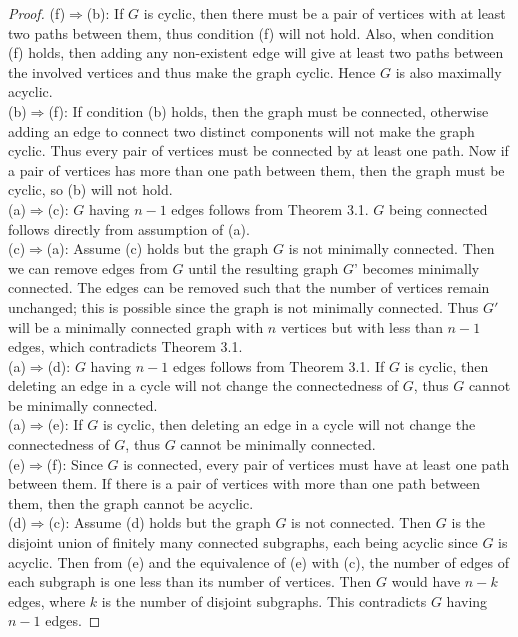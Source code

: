\documentclass{article}
\begin{document}
\begin{enumerate}[label={\bf Q\arabic*:}]
\begin{proof}
      (f)$\Rightarrow$(b): If $G$ is cyclic, then there must be a pair of
      vertices with at least two paths between them, thus condition (f)
      will not hold. Also, when condition (f) holds, then adding any
      non-existent edge will give at least two paths between the involved
      vertices and thus make the graph cyclic. Hence $G$ is also maximally
      acyclic. \\

      (b)$\Rightarrow$(f): If condition (b) holds, then the graph must be
      connected, otherwise adding an edge to connect two distinct
      components will not make the graph cyclic. Thus every pair of
      vertices must be connected by at least one path. Now if a pair of
      vertices has more than one path between them, then the graph must be
      cyclic, so (b) will not hold. \\

      (a)$\Rightarrow$(c): $G$ having $n-1$ edges follows from Theorem 3.1.
      $G$ being connected follows directly from assumption of (a). \\

      (c)$\Rightarrow$(a): Assume (c) holds but the graph $G$ is not
      minimally connected. Then we can remove edges from $G$ until the
      resulting graph $G$' becomes minimally connected. The edges can be
      removed such that the number of vertices remain unchanged; this is
      possible since the graph is not minimally connected. Thus $G'$ will
      be a minimally connected graph with $n$ vertices but with less than
      $n-1$ edges, which contradicts Theorem 3.1. \\

      (a)$\Rightarrow$(d): $G$ having $n-1$ edges follows from Theorem 3.1.
      If $G$ is cyclic, then deleting an edge in a cycle will not change
      the connectedness of $G$, thus $G$ cannot be minimally connected. \\

      (a)$\Rightarrow$(e): If $G$ is cyclic, then deleting an edge in a
      cycle will not change the connectedness of $G$, thus $G$ cannot be
      minimally connected. \\

      (e)$\Rightarrow$(f): Since $G$ is connected, every pair of vertices
      must have at least one path between them. If there is a pair of
      vertices with more than one path between them, then the graph cannot
      be acyclic. \\

      (d)$\Rightarrow$(c): Assume (d) holds but the graph $G$ is not
      connected. Then $G$ is the disjoint union of finitely many connected
      subgraphs, each being acyclic since $G$ is acyclic. Then from (e) and
      the equivalence of (e) with (c), the number of edges of each subgraph
      is one less than its number of vertices. Then $G$ would have $n-k$
      edges, where $k$ is the number of disjoint subgraphs. This
      contradicts $G$ having $n-1$ edges.
    \end{proof}
\end{enumerate}
\end{document}
